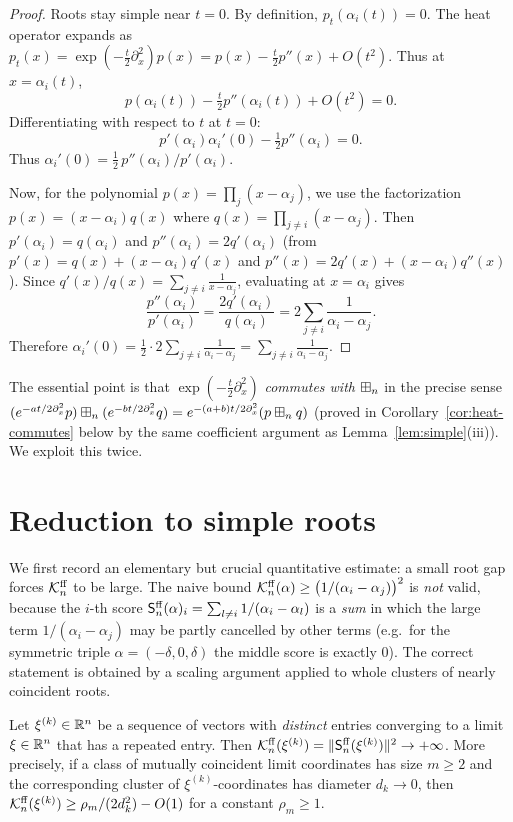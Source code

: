 \begin{proof}
Roots stay simple near $t=0$. By definition, $p_t(\alpha_i(t))=0$. The heat operator
expands as $p_t(x)=\exp(-\tfrac{t}{2}\partial_x^2)p(x)=p(x)-\tfrac{t}{2}p''(x)+O(t^2)$.
Thus at $x=\alpha_i(t)$,
\[
p(\alpha_i(t))-\tfrac{t}{2}p''(\alpha_i(t))+O(t^2)=0.
\]
Differentiating with respect to $t$ at $t=0$:
\[
p'(\alpha_i)\alpha_i'(0)-\tfrac{1}{2}p''(\alpha_i)=0.
\]
Thus $\alpha_i'(0)=\tfrac{1}{2}\,p''(\alpha_i)/p'(\alpha_i)$.

Now, for the polynomial $p(x)=\prod_j(x-\alpha_j)$, we use the factorization
$p(x)=(x-\alpha_i)q(x)$ where $q(x)=\prod_{j\ne i}(x-\alpha_j)$. Then
$p'(\alpha_i)=q(\alpha_i)$ and $p''(\alpha_i)=2q'(\alpha_i)$ (from $p'(x)=q(x)+(x-\alpha_i)q'(x)$
and $p''(x)=2q'(x)+(x-\alpha_i)q''(x)$). Since $q'(x)/q(x)=\sum_{j\ne i}\tfrac{1}{x-\alpha_j}$,
evaluating at $x=\alpha_i$ gives
\[
\frac{p''(\alpha_i)}{p'(\alpha_i)}=\frac{2q'(\alpha_i)}{q(\alpha_i)}=2\sum_{j\ne i}\frac{1}{\alpha_i-\alpha_j}.
\]
Therefore $\alpha_i'(0)=\tfrac{1}{2}\cdot 2\sum_{j\ne i}\tfrac{1}{\alpha_i-\alpha_j}=\sum_{j\ne i}\tfrac{1}{\alpha_i-\alpha_j}$.
\end{proof}

The essential point is that $\exp(-\tfrac t2\partial_x^2)$ \emph{commutes with}
$\boxplus_n$ in the precise sense
$(e^{-at/2\partial_x^2}p)\boxplus_n(e^{-bt/2\partial_x^2}q)=e^{-(a+b)t/2\partial_x^2}(p\boxplus_n q)$
(proved in Corollary~\ref{cor:heat-commutes} below by the same coefficient
argument as Lemma~\ref{lem:simple}(iii)). We exploit this twice.

\section*{Reduction to simple roots}

We first record an elementary but crucial quantitative estimate: a small root
gap forces $\mathcal{K}^{\mathrm{ff}}_n$ to be large. The naive bound
$\mathcal{K}^{\mathrm{ff}}_n(\alpha)\ge\bigl(1/(\alpha_i-\alpha_j)\bigr)^2$ is \emph{not} valid,
because the $i$-th score $\mathsf{S}^{\mathrm{ff}}_n(\alpha)_i=\sum_{l\ne i}1/(\alpha_i-\alpha_l)$
is a \emph{sum} in which the large term $1/(\alpha_i-\alpha_j)$ may be partly
cancelled by other terms (e.g.\ for the symmetric triple
$\alpha=(-\delta,0,\delta)$ the middle score is exactly $0$). The correct
statement is obtained by a scaling argument applied to whole clusters of nearly
coincident roots.

\begin{qfourlemma}\label{lem:gapblowup}
Let $\xi^{(k)}\in\mathbb{R}^n$ be a sequence of vectors with \emph{distinct} entries
converging to a limit $\xi\in\mathbb{R}^n$ that has a repeated entry. Then
$\mathcal{K}^{\mathrm{ff}}_n(\xi^{(k)})=\|\mathsf{S}^{\mathrm{ff}}_n(\xi^{(k)})\|^2\to+\infty$. More precisely,
if a class of mutually coincident limit coordinates has size $m\ge2$ and the
corresponding cluster of $\xi^{(k)}$-coordinates has diameter $d_k\to0$, then
$\mathcal{K}^{\mathrm{ff}}_n(\xi^{(k)})\ge \rho_m/(2d_k^2)-O(1)$ for a constant $\rho_m\ge1$.
\end{qfourlemma}

